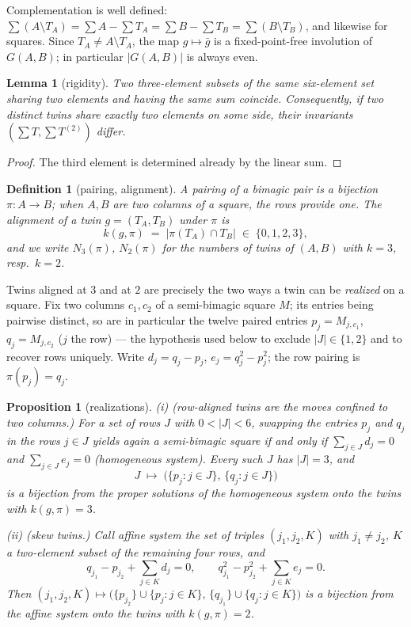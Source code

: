 \documentclass[11pt]{article}
\newtheorem{proposition}[theorem]{Proposition}
\newtheorem{lemma}[theorem]{Lemma}
\newtheorem{definition}[theorem]{Definition}
\begin{document}
Complementation is well defined: $\sum(A\setminus T_A)=\sum A-\sum
T_A=\sum B-\sum T_B=\sum(B\setminus T_B)$, and likewise for squares.
Since $T_A\ne A\setminus T_A$, the map $g\mapsto\bar g$ is a
fixed-point-free involution of $G(A,B)$; in particular $|G(A,B)|$ is
always even.

\begin{lemma}[rigidity]\label{lem:rigid}
Two three-element subsets of the same six-element set sharing two
elements and having the same sum coincide. Consequently, if two
distinct twins share exactly two elements on some side, their
invariants $(\sum T,\sum T^{(2)})$ differ.
\end{lemma}

\begin{proof}
The third element is determined already by the linear sum.
\end{proof}

\begin{definition}[pairing, alignment]\label{def:align}
A \emph{pairing} of a bimagic pair is a bijection $\pi\colon A\to B$;
when $A,B$ are two columns of a square, the rows provide one. The
\emph{alignment} of a twin $g=(T_A,T_B)$ under $\pi$ is
\[
k(g,\pi)\;=\;|\pi(T_A)\cap T_B|\;\in\;\{0,1,2,3\},
\]
and we write $N_3(\pi)$, $N_2(\pi)$ for the numbers of twins of
$(A,B)$ with $k=3$, resp.\ $k=2$.
\end{definition}

Twins aligned at $3$ and at $2$ are precisely the two ways a twin can
be \emph{realized} on a square. Fix two columns $c_1,c_2$ of a
semi-bimagic square $M$; its entries being pairwise distinct, so are
in particular the twelve paired entries $p_j=M_{j,c_1}$,
$q_j=M_{j,c_2}$ ($j$ the row) --- the hypothesis used below to
exclude $|J|\in\{1,2\}$ and to recover rows uniquely. Write
$d_j=q_j-p_j$, $e_j=q_j^2-p_j^2$; the row pairing is
$\pi(p_j)=q_j$.

\begin{proposition}[realizations]\label{prop:real}
\emph{(i) (row-aligned twins are the moves confined to two columns.)}
For a set of rows $J$ with $0<|J|<6$, swapping the entries $p_j$ and
$q_j$ in the rows $j\in J$ yields again a semi-bimagic square if and
only if $\sum_{j\in J}d_j=0$ and $\sum_{j\in J}e_j=0$
(\emph{homogeneous system}). Every such $J$ has $|J|=3$, and
\[
J\;\longmapsto\;\bigl(\{p_j\colon j\in J\},\,\{q_j\colon j\in J\}\bigr)
\]
is a bijection from the proper solutions of the homogeneous system
onto the twins with $k(g,\pi)=3$.

\emph{(ii) (skew twins.)} Call \emph{affine system} the set of
triples $(j_1,j_2,K)$ with $j_1\ne j_2$, $K$ a two-element subset of
the remaining four rows, and
\[
q_{j_1}-p_{j_2}+\textstyle\sum_{j\in K}d_j=0,\qquad
q_{j_1}^2-p_{j_2}^2+\textstyle\sum_{j\in K}e_j=0 .
\]
Then
$(j_1,j_2,K)\mapsto\bigl(\{p_{j_2}\}\cup\{p_j\colon j\in K\},\,
\{q_{j_1}\}\cup\{q_j\colon j\in K\}\bigr)$
is a bijection from the affine system onto the twins with
$k(g,\pi)=2$.
\end{proposition}
\end{document}
